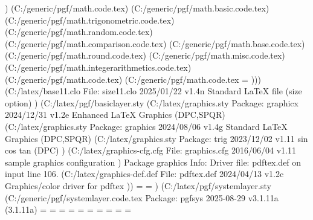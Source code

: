 ) (C:\Users\SEARS\AppData\Local\Programs\MiKTeX\tex/generic/pgf/math\pgfmathfunctions.code.tex) (C:\Users\SEARS\AppData\Local\Programs\MiKTeX\tex/generic/pgf/math\pgfmathfunctions.basic.code.tex) (C:\Users\SEARS\AppData\Local\Programs\MiKTeX\tex/generic/pgf/math\pgfmathfunctions.trigonometric.code.tex) (C:\Users\SEARS\AppData\Local\Programs\MiKTeX\tex/generic/pgf/math\pgfmathfunctions.random.code.tex) (C:\Users\SEARS\AppData\Local\Programs\MiKTeX\tex/generic/pgf/math\pgfmathfunctions.comparison.code.tex) (C:\Users\SEARS\AppData\Local\Programs\MiKTeX\tex/generic/pgf/math\pgfmathfunctions.base.code.tex) (C:\Users\SEARS\AppData\Local\Programs\MiKTeX\tex/generic/pgf/math\pgfmathfunctions.round.code.tex) (C:\Users\SEARS\AppData\Local\Programs\MiKTeX\tex/generic/pgf/math\pgfmathfunctions.misc.code.tex) (C:\Users\SEARS\AppData\Local\Programs\MiKTeX\tex/generic/pgf/math\pgfmathfunctions.integerarithmetics.code.tex) (C:\Users\SEARS\AppData\Local\Programs\MiKTeX\tex/generic/pgf/math\pgfmathcalc.code.tex) (C:\Users\SEARS\AppData\Local\Programs\MiKTeX\tex/generic/pgf/math\pgfmathfloat.code.tex
\c@pgfmathroundto@lastzeros=
))) (C:\Users\SEARS\AppData\Local\Programs\MiKTeX\tex/latex/base\size11.clo
File: size11.clo 2025/01/22 v1.4n Standard LaTeX file (size option)
) (C:\Users\SEARS\AppData\Local\Programs\MiKTeX\tex/latex/pgf/basiclayer\pgfcore.sty (C:\Users\SEARS\AppData\Local\Programs\MiKTeX\tex/latex/graphics\graphicx.sty
Package: graphicx 2024/12/31 v1.2e Enhanced LaTeX Graphics (DPC,SPQR)
 (C:\Users\SEARS\AppData\Local\Programs\MiKTeX\tex/latex/graphics\graphics.sty
Package: graphics 2024/08/06 v1.4g Standard LaTeX Graphics (DPC,SPQR)
 (C:\Users\SEARS\AppData\Local\Programs\MiKTeX\tex/latex/graphics\trig.sty
Package: trig 2023/12/02 v1.11 sin cos tan (DPC)
) (C:\Users\SEARS\AppData\Local\Programs\MiKTeX\tex/latex/graphics-cfg\graphics.cfg
File: graphics.cfg 2016/06/04 v1.11 sample graphics configuration
)
Package graphics Info: Driver file: pdftex.def on input line 106.
 (C:\Users\SEARS\AppData\Local\Programs\MiKTeX\tex/latex/graphics-def\pdftex.def
File: pdftex.def 2024/04/13 v1.2c Graphics/color driver for pdftex
))
\Gin@req@height=
\Gin@req@width=
) (C:\Users\SEARS\AppData\Local\Programs\MiKTeX\tex/latex/pgf/systemlayer\pgfsys.sty (C:\Users\SEARS\AppData\Local\Programs\MiKTeX\tex/generic/pgf/systemlayer\pgfsys.code.tex
Package: pgfsys 2025-08-29 v3.1.11a (3.1.11a)
\pgf@x=
\pgf@y=
\pgf@xa=
\pgf@ya=
\pgf@xb=
\pgf@yb=
\pgf@xc=
\pgf@yc=
\pgf@xd=
\pgf@yd=
